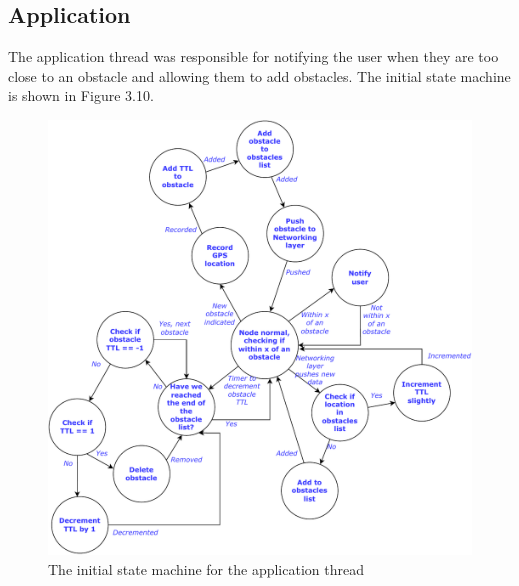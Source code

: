 \documentclass[12pt,a4paper]{report}
\begin{document}
\subsection{Application}
The application thread was responsible for notifying the user when they are too close to an obstacle and allowing them to add obstacles. The initial state machine is shown in Figure 3.10. 
\begin{figure}[h]
\begin{center}
\includegraphics[scale=0.6]{app.pdf}
\end{center}
\caption{The initial state machine for the application thread}
\end{figure}
\FloatBarrier
\end{document}
